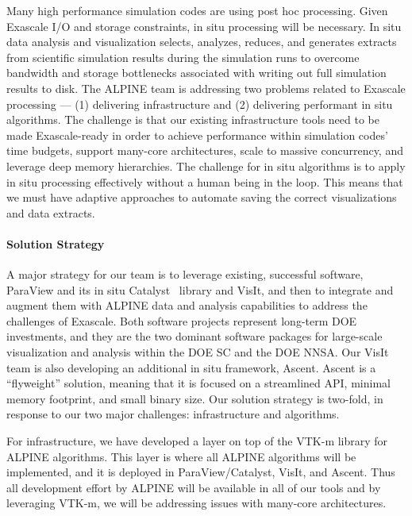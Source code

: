 Many high performance simulation codes are using post hoc processing.  
Given Exascale I/O and storage constraints, in situ processing will be necessary. 
In situ data analysis and visualization selects, analyzes, reduces, and generates extracts from scientific simulation results during the simulation runs to overcome bandwidth and storage bottlenecks associated with writing out full simulation results to disk. 
The ALPINE team is addressing two problems related to Exascale processing --- (1) delivering infrastructure and (2) delivering performant in situ algorithms.
The challenge is that our existing infrastructure tools need to be made Exascale-ready in order to 
achieve performance within simulation codes' time budgets, support many-core architectures, scale to massive concurrency, and leverage deep memory hierarchies.
The challenge for in situ algorithms is to apply in situ processing effectively without a human being in the loop.
This means that we must have adaptive approaches to automate saving the correct visualizations and data extracts.


\paragraph{Solution Strategy}

A major strategy for our team is to leverage existing, successful software, ParaView and its in situ Catalyst~\cite{Catalyst} library and VisIt, and then to integrate and augment them with ALPINE data and analysis capabilities to address the challenges of Exascale. 
%
Both software projects represent long-term DOE investments, and they are the two dominant software packages for large-scale visualization and analysis within the DOE SC and the DOE NNSA. 
%
Our VisIt team is also developing an additional  in situ framework, Ascent.  Ascent is a ``flyweight'' solution, meaning that it is focused on a streamlined API, minimal memory footprint, and small binary size.
Our solution strategy is two-fold, in response to our two major challenges: infrastructure and algorithms.

For infrastructure, we have developed a layer on top of the VTK-m library for ALPINE algorithms.
This layer is where all ALPINE algorithms will be implemented, and it is deployed in ParaView/Catalyst, VisIt, and Ascent.
Thus all development effort by ALPINE will be available in all of our tools and by leveraging VTK-m, we will be addressing issues with many-core architectures.  

